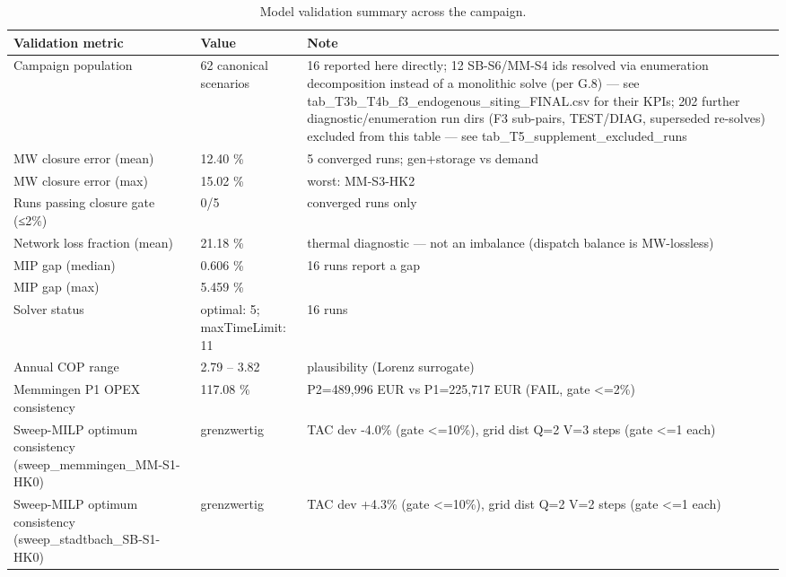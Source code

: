 \begin{table}[htbp]
  \centering
  \caption{Model validation summary across the campaign.}
  \label{tab:t5_validation}
  \begin{tabular}{lll}
  \toprule
  Validation metric & Value & Note \\
  \midrule
  Campaign population & 62 canonical scenarios & 16 reported here directly; 12 SB-S6/MM-S4 ids resolved via enumeration decomposition instead of a monolithic solve (per G.8) — see tab\_T3b\_T4b\_f3\_endogenous\_siting\_FINAL.csv for their KPIs; 202 further diagnostic/enumeration run dirs (F3 sub-pairs, TEST/DIAG, superseded re-solves) excluded from this table — see tab\_T5\_supplement\_excluded\_runs \\
  MW closure error (mean) & 12.40 \% & 5 converged runs; gen+storage vs demand \\
  MW closure error (max) & 15.02 \% & worst: MM-S3-HK2 \\
  Runs passing closure gate (≤2\%) & 0/5 & converged runs only \\
  Network loss fraction (mean) & 21.18 \% & thermal diagnostic — not an imbalance (dispatch balance is MW-lossless) \\
  MIP gap (median) & 0.606 \% & 16 runs report a gap \\
  MIP gap (max) & 5.459 \% &  \\
  Solver status & optimal: 5; maxTimeLimit: 11 & 16 runs \\
  Annual COP range & 2.79 -- 3.82 & plausibility (Lorenz surrogate) \\
  Memmingen P1 OPEX consistency & 117.08 \% & P2=489,996 EUR vs P1=225,717 EUR (FAIL, gate <=2\%) \\
  Sweep-MILP optimum consistency (sweep\_memmingen\_MM-S1-HK0) & grenzwertig & TAC dev -4.0\% (gate <=10\%), grid dist Q=2 V=3 steps (gate <=1 each) \\
  Sweep-MILP optimum consistency (sweep\_stadtbach\_SB-S1-HK0) & grenzwertig & TAC dev +4.3\% (gate <=10\%), grid dist Q=2 V=2 steps (gate <=1 each) \\
  \bottomrule
  \end{tabular}
\end{table}
